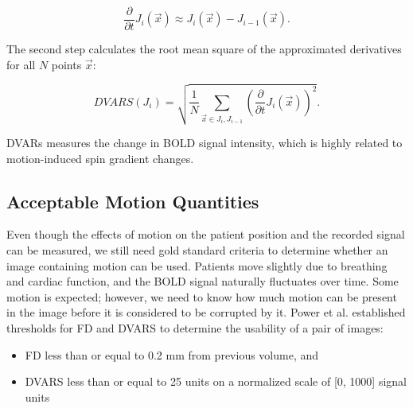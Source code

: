 \begin{equation}
\frac{\partial}{\partial t} J_i(\vec{x}) \approx J_i(\vec{x}) - J_{i-1}(\vec{x}).
\end{equation}


The second step calculates the root mean square of the approximated derivatives for all $N$ points $\vec{x}$:

\begin{equation}
DVARS(J_i) = \sqrt{ \frac{1}{N} \sum_{\vec{x} \in J_i, J_{i-1}} \left( \frac{\partial}{\partial t} J_i(\vec{x}) \right)^2 }.
\end{equation}

DVARs measures the change in BOLD signal intensity, which is highly related to motion-induced spin gradient changes. 

\subsection{Acceptable Motion Quantities}



Even though the effects of motion on the patient position and the recorded signal can be measured, we still need gold standard criteria to determine whether an image containing motion can be used. Patients move slightly due to breathing and cardiac function, and the BOLD signal naturally fluctuates over time. Some motion is expected; however, we need to know how much motion can be present in the image before it is considered to be corrupted by it. Power et al. established thresholds for FD and DVARS to determine the usability of a pair of images:
\begin{itemize}
\item FD less than or equal to 0.2 mm from previous volume, and
\item DVARS less than or equal to 25 units on a normalized scale of [0, 1000] signal units \cite{Power2014}
\end{itemize}

